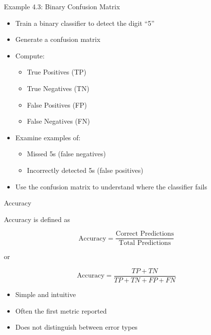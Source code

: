 \documentclass[aspectratio=169]{beamer}
\begin{document}
\begin{frame}{Example 4.3: Binary Confusion Matrix}
	
	\begin{itemize}
		\item Train a binary classifier to detect the digit ``5''
		\item Generate a confusion matrix
		\item Compute:
		\begin{itemize}
			\item True Positives (TP)
			\item True Negatives (TN)
			\item False Positives (FP)
			\item False Negatives (FN)
		\end{itemize}
		
		\vspace{0.5em}
		
		\item Examine examples of:
		\begin{itemize}
			\item Missed 5s (false negatives)
			\item Incorrectly detected 5s (false positives)
		\end{itemize}
		
		\vspace{0.5em}
		
		\item Use the confusion matrix to understand where the classifier fails
	\end{itemize}
	
\end{frame}


\begin{frame}{Accuracy}
	
	Accuracy is defined as
	
	\[
	\text{Accuracy}
	=
	\frac{\text{Correct Predictions}}
	{\text{Total Predictions}}
	\]
	
	or
	
	\[
	\text{Accuracy}
	=
	\frac{TP+TN}
	{TP+TN+FP+FN}
	\]
	
	\vspace{0.5em}
	
	\begin{itemize}
		\item Simple and intuitive
		\item Often the first metric reported
		\item Does not distinguish between error types
	\end{itemize}
	
\end{frame}
\end{document}
